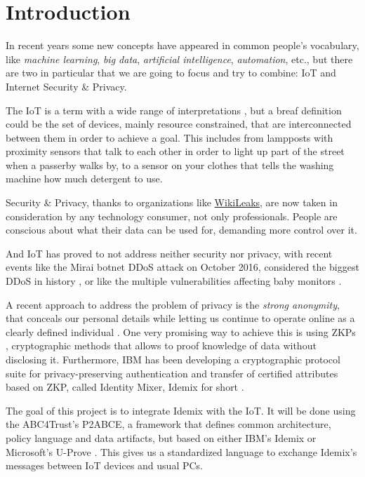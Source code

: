 \chapter{Introduction}\label{ch:introduction}

In recent years some new concepts have appeared in common people's vocabulary, like \textit{machine learning}, \textit{big data}, \textit{artificial intelligence}, \textit{automation}, etc., but there are two in particular that we are going to focus and try to combine: \ac{IoT} and Internet Security \& Privacy.

The \ac{IoT} is a term with a wide range of interpretations \citep{Atzori20102787}, but a breaf definition could be the set of devices, mainly resource constrained, that are interconnected between them in order to achieve a goal. This includes from lampposts with proximity sensors that talk to each other in order to light up part of the street when a passerby walks by, to a sensor on your clothes that tells the washing machine how much detergent to use.

Security \& Privacy, thanks to organizations like \href{https://wikileaks.org/}{WikiLeaks}, are now taken in consideration by any technology consumer, not only professionals. People are conscious about what their data can be used for, demanding more control over it.

And IoT has proved to not address neither security nor privacy, with recent events like the Mirai botnet DDoS attack on October 2016, considered the biggest DDoS in history \citep{jeyanthi:2017}, or like the multiple vulnerabilities affecting baby monitors \citep{rapid7babycam}.


A recent approach to address the problem of privacy is the \textit{strong anonymity},  that conceals our personal details while letting us continue to operate online as a clearly defined individual \citep{stronganonymity}. One very promising way to achieve this is using \acp{ZKP}
, cryptographic methods that allows to proof knowledge of data without disclosing it. Furthermore, IBM has been developing a cryptographic protocol suite for privacy-preserving authentication and transfer of certified attributes based on \ac{ZKP}, called Identity Mixer, Idemix for short \citep{idemixurl}.

The goal of this project is to integrate Idemix with the \ac{IoT}. It will be done using the ABC4Trust's \ac{P2ABCE}, a framework that defines common architecture, policy language and data artifacts, but based on either IBM's Idemix or Microsoft's U-Prove \citep{p2abcurl}. This gives us a standardized language to exchange Idemix's messages between \ac{IoT} devices and usual PCs.

